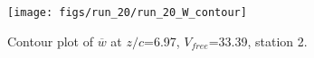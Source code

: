 \begin{figure}[H]
\centering
\texttt{[image: figs/run\_20/run\_20\_W\_contour]}
\caption{Contour plot of $\overline{w}$ at $z/c$=6.97, $V_{free}$=33.39, station 2.}
\label{fig:run_20_W_contour}
\end{figure}


